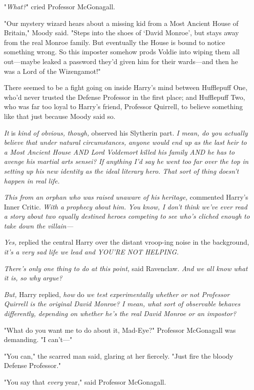 "\emph{What?}" cried Professor McGonagall.

"Our mystery wizard hears about a missing kid from a Most Ancient House of
Britain," Moody said. "Steps into the shoes of `David Monroe', but stays away
from the real Monroe family. But eventually the House is bound to notice
something wrong. So this imposter somehow prods Voldie into wiping them all
out---maybe leaked a password they'd given him for their wards---and then he
was a Lord of the Wizengamot!"

There seemed to be a fight going on inside Harry's mind between Hufflepuff One,
who'd never trusted the Defense Professor in the first place; and Hufflepuff
Two, who was far too loyal to Harry's friend, Professor Quirrell, to believe
something like that just because Moody said so.

\emph{It} is \emph{kind of obvious, though,} observed his Slytherin part.
\emph{I mean, do you actually believe that under natural circumstances, anyone
would end up as the last heir to a Most Ancient House AND Lord Voldemort killed
his family AND he has to avenge his martial arts sensei? If anything I'd say he
went too far over the top in setting up his new identity as the ideal literary
hero. That sort of thing doesn't happen in real life.}

\emph{This from an orphan who was raised unaware of his heritage,} commented
Harry's Inner Critic. \emph{With a prophecy about him. You know, I don't think
we've ever read a story about two equally destined heroes competing to see
who's cliched enough to take down the villain---}

\emph{Yes,} replied the central Harry over the distant vroop-ing noise in the
background, \emph{it's a very sad life we lead and YOU'RE NOT HELPING.}

\emph{There's only one thing to do at this point,} said Ravenclaw. \emph{And we
all know what it is, so why argue?}

\emph{But,} Harry replied, \emph{how} do \emph{we test experimentally whether
or not Professor Quirrell is the original David Monroe? I mean, what sort of
observable behaves differently, depending on whether he's the real David Monroe
or an impostor?}

"What do you want me to do about it, Mad-Eye?" Professor McGonagall was
demanding. "I can't---"

"You can," the scarred man said, glaring at her fiercely. "Just fire the bloody
Defense Professor."

"You say that \emph{every} year," said Professor McGonagall.

